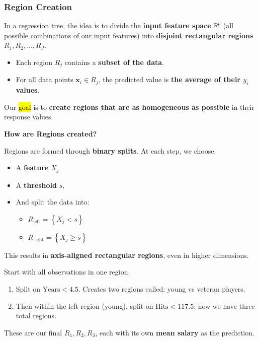 \subsubsection{Region Creation}

In a regression tree, the idea is to divide the \textbf{input feature space} $\mathbb{R}^p$ (all possible combinations of our input features) into \textbf{disjoint rectangular regions} $R_1, R_2, \dots, R_J$.
\begin{itemize}
    \item Each region $R_j$ contains a \textbf{subset of the data}.
    \item For all data points $\mathbf{x}_i \in R_j$, the predicted value is \textbf{the average of their $y_i$ values}.
\end{itemize}
Our \hl{goal} is to \textbf{create regions that are as homogeneous as possible} in their response values.

\highspace
\begin{flushleft}
    \textcolor{Green3}{ \textbf{How are Regions created?}}
\end{flushleft}
Regions are formed through \textbf{binary splits}. At each step, we choose:
\begin{itemize}
    \item A \textbf{feature} $X_j$
    \item A \textbf{threshold} $s$,
    \item And split the data into:
    \begin{itemize}
        \item $R_{\text{left}} = \left\{ X_j < s \right\}$
        \item $R_{\text{right}} = \left\{ X_j \geq s \right\}$
    \end{itemize}
\end{itemize}
This results in \textbf{axis-aligned rectangular regions}, even in higher dimensions.

\begin{examplebox}
    Start with all observations in one region.
    \begin{enumerate}
        \item Split on $\text{Years} < 4.5$. Creates two regions called: young vs veteran players.
        \item Then within the left region (young), split on $\text{Hits} < 117.5$: now we have three total regions.
    \end{enumerate}
    These are our final $R_1, R_2, R_3$, each with its own \textbf{mean salary} as the prediction.
\end{examplebox}

